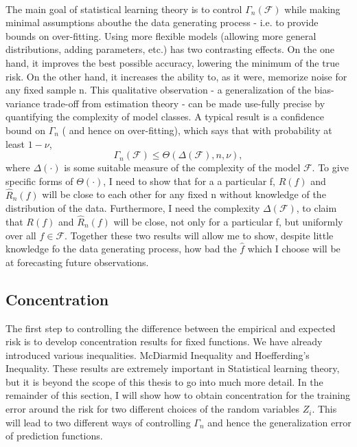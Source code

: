 \documentclass{article}
\def\cF{\ensuremath{\mathcal{F}}}
\theoremstyle{plain}
\renewcommand{\hat}[1]{\widehat{#1}}
\begin{document}
\paragraph{} The main goal of statistical learning theory is to control $\Gamma_n(\cF)$ while making minimal assumptions abouthe the data generating 
process - i.e. to provide bounds on over-fitting. Using more flexible models (allowing more general distributions, adding parameters, etc.) has two 
contrasting effects. On the one hand, it improves the best possible accuracy, lowering the minimum of the true risk. On the other hand, it increases 
the ability to, as it were, memorize noise for any fixed sample n. This qualitative observation - a generalization of the bias-variance trade-off from
estimation theory - can be made use-fully precise by quantifying the complexity of model classes. A typical result is a confidence bound on $\Gamma_n$ (
and hence on over-fitting), which says that with probability at least $1 - \nu$,
\begin{equation}
\Gamma_n(\cF) \leq \Theta(\Delta(\cF), n, \nu),
\end{equation} 
where $\Delta(\cdot)$ is some suitable measure of the complexity of the model $\cF$. To give specific forms of $\Theta(\cdot)$, I need to show that
for a a particular f, $R(f)$ and $\hat{R}_{n}(f)$ will be close to each other for any fixed n without knowledge of the distribution of the data. 
Furthermore, I need the complexity $\Delta(\cF)$, to claim that $R(f)$ and $\hat{R}_{n}(f)$ will be close, not only for a particular f, but
uniformly over all $f \in \cF$. Together these two results will allow me to show, despite little knowledge fo the data generating process, how bad the $
\hat{f}$ which I choose will be at forecasting future observations.
\subsection{Concentration}
The first step to controlling the difference between the empirical and expected risk is to develop concentration results for fixed functions.
We have already introduced various inequalities. McDiarmid Inequality and Hoefferding's Inequality.
These results are extremely important in Statistical learning theory, but it is beyond the scope of this thesis to go into much more detail.
In the remainder of this section, I will show how to obtain concentration for the training error around the risk for two different choices of the random
variables $Z_i$. This will lead to two different ways of controlling $\Gamma_n$ and hence the generalization error of prediction functions. 
\end{document}
